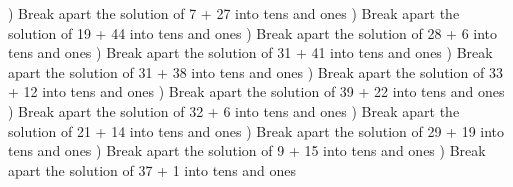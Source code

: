 \documentclass{article}%
\begin{document}
\newline%
) Break apart the solution of 7 + 27 into tens and ones%
\newline%
\newline%
) Break apart the solution of 19 + 44 into tens and ones%
\newline%
\newline%
) Break apart the solution of 28 + 6 into tens and ones%
\newline%
\newline%
) Break apart the solution of 31 + 41 into tens and ones%
\newline%
\newline%
) Break apart the solution of 31 + 38 into tens and ones%
\newline%
\newline%
) Break apart the solution of 33 + 12 into tens and ones%
\newline%
\newline%
) Break apart the solution of 39 + 22 into tens and ones%
\newline%
\newline%
) Break apart the solution of 32 + 6 into tens and ones%
\newline%
\newline%
) Break apart the solution of 21 + 14 into tens and ones%
\newline%
\newline%
) Break apart the solution of 29 + 19 into tens and ones%
\newline%
\newline%
) Break apart the solution of 9 + 15 into tens and ones%
\newline%
\newline%
) Break apart the solution of 37 + 1 into tens and ones%
\newline%
\newline%
\newline%
\end{document}
